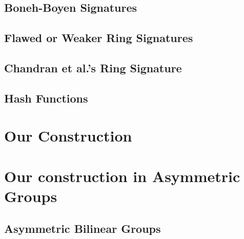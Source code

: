 \documentclass{llncs}
\begin{document}
        \subsection{Boneh-Boyen Signatures} \label{sec:bbs}
    
            

    \subsection{Flawed or Weaker Ring Signatures}\label{sec:rs-flawed}
    
         

       \subsection{Chandran et al.'s Ring Signature}
	
         

	\subsection{Hash Functions} \label{sec:hash}

	

    \section{Our Construction}

	
        
    	
        



\appendix

\section{Our construction in Asymmetric Groups}

	

	\subsection{Asymmetric Bilinear Groups}
		
\end{document}
